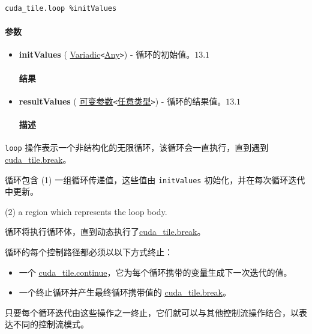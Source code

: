 \documentclass{article}
\begin{document}
\begin{lstlisting}
cuda_tile.loop %initValues
\end{lstlisting}

\paragraph{参数}

\begin{itemize}
\item \textbf{initValues} ( \href{https://docs.nvidia.com/cuda/tile-ir/latest/sections/operations.html#type-variadic}{Variadic}\texttt{<}\href{https://docs.nvidia.com/cuda/tile-ir/latest/sections/operations.html#type-any}{Any}\texttt{>}) - 循环的初始值。$\boxed{13.1}$


\paragraph{结果}

\item \textbf{resultValues} ( \href{https://docs.nvidia.com/cuda/tile-ir/latest/sections/operations.html#type-variadic}{可变参数}\texttt{<}\href{https://docs.nvidia.com/cuda/tile-ir/latest/sections/operations.html#type-any}{任意类型}\texttt{>}) - 循环的结果值。$\boxed{13.1}$


\paragraph{描述}

\end{itemize}
\texttt{loop} 操作表示一个非结构化的无限循环，该循环会一直执行，直到遇到 \href{https://docs.nvidia.com/cuda/tile-ir/latest/sections/operations.html#op-cuda-tile-break}{cuda\_tile.break}。


循环包含 (1) 一组循环传递值，这些值由 \texttt{initValues} 初始化，并在每次循环迭代中更新。

(2) a region which represents the loop body.


循环将执行循环体，直到动态执行了\href{https://docs.nvidia.com/cuda/tile-ir/latest/sections/operations.html#op-cuda-tile-break}{cuda\_tile.break}。


循环的每个控制路径都必须以以下方式终止：


\begin{itemize}
\item 一个 \href{https://docs.nvidia.com/cuda/tile-ir/latest/sections/operations.html#op-cuda-tile-continue}{cuda\_tile.continue}，它为每个循环携带的变量生成下一次迭代的值。
\item 一个终止循环并产生最终循环携带值的 \href{https://docs.nvidia.com/cuda/tile-ir/latest/sections/operations.html#op-cuda-tile-break}{cuda\_tile.break}。

\end{itemize}
只要每个循环迭代由这些操作之一终止，它们就可以与其他控制流操作结合，以表达不同的控制流模式。
\end{document}
